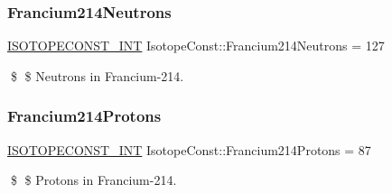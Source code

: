 \subsubsection{\texorpdfstring{Francium214\+Neutrons}{Francium214Neutrons}}
{\footnotesize\ttfamily \mbox{\hyperlink{group___isotope_const-_macros_ga5f18360b3e99483a35c32d789e62621c}{I\+S\+O\+T\+O\+P\+E\+C\+O\+N\+S\+T\+\_\+\+I\+NT}} Isotope\+Const\+::\+Francium214\+Neutrons = 127}

\$ \$ Neutrons in Francium-\/214. \mbox{\label{group___isotope_const-_francium-_fr214_gaca99c77d96fb1e75181aa63d235193e6}} 
\subsubsection{\texorpdfstring{Francium214\+Protons}{Francium214Protons}}
{\footnotesize\ttfamily \mbox{\hyperlink{group___isotope_const-_macros_ga5f18360b3e99483a35c32d789e62621c}{I\+S\+O\+T\+O\+P\+E\+C\+O\+N\+S\+T\+\_\+\+I\+NT}} Isotope\+Const\+::\+Francium214\+Protons = 87}

\$ \$ Protons in Francium-\/214. 